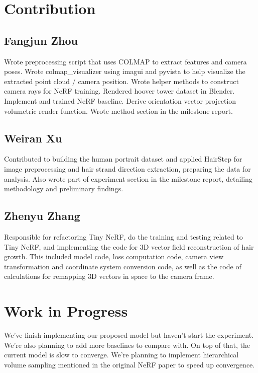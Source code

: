 \documentclass[12pt]{article}
\begin{document}
  \section{Contribution}

  \subsection{Fangjun Zhou}

  Wrote preprocessing script that uses COLMAP to extract features and camera poses. Wrote colmap\_visualizer using imagui and pyvista to help visualize the extracted point cloud / camera position. Wrote helper methods to construct camera rays for NeRF training. Rendered hoover tower dataset in Blender. Implement and trained NeRF baseline. Derive orientation vector projection volumetric render function. Wrote method section in the milestone report.

  \subsection{Weiran Xu}
  
  Contributed to building the human portrait dataset and applied HairStep for image preprocessing and hair strand direction extraction, preparing the data for analysis. Also wrote part of experiment section in the milestone report, detailing methodology and preliminary findings.

  \subsection{Zhenyu Zhang}
  
  Responsible for refactoring Tiny NeRF, do the training and testing related to Tiny NeRF, and implementing the code for 3D vector field reconstruction of hair growth. This included model code, loss computation code, camera view transformation and coordinate system conversion code, as well as the code of calculations for remapping 3D vectors in space to the camera frame.
  
  \section{Work in Progress}

  We've finish implementing our proposed model but haven't start the experiment. We're also planning to add more baselines to compare with. On top of that, the current model is slow to converge. We're planning to implement hierarchical volume sampling mentioned in the original NeRF paper to speed up convergence.

  \printbibliography
\end{document}
